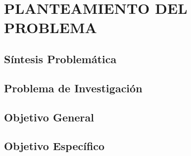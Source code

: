 \chapter{PLANTEAMIENTO DEL PROBLEMA} \label{cap:plant}
    \lipsum[2 - 6]
	\section{Síntesis Problemática}	\label{sec:situacion}
	    \lipsum[2 - 5]
	\section{Problema de Investigación}	\label{sec:problema}
	    \lipsum[2 - 3]
	\section{Objetivo General}	\label{sec:og}
	    \lipsum[1 - 6]
	\section{Objetivo Específico}	\label{sec:oe}
	
	
